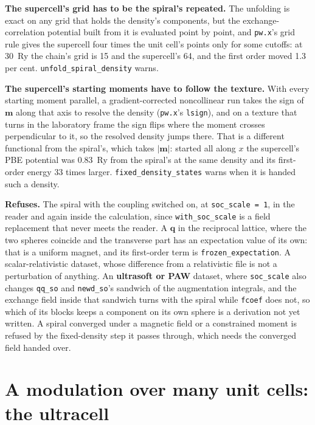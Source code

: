 \documentclass[11pt,a4paper]{article}
\newcommand{\code}[1]{\texttt{\small #1}}
\begin{document}
\textbf{The supercell's grid has to be the spiral's repeated.} The unfolding is
exact on any grid that holds the density's components, but the
exchange-correlation potential built from it is evaluated point by point, and
\code{pw.x}'s grid rule gives the supercell four times the unit cell's points
only for some cutoffs: at 30~Ry the chain's grid is 15 and the supercell's 64,
and the first order moved 1.3 per cent. \code{unfold\_spiral\_density} warns.

\textbf{The supercell's starting moments have to follow the texture.} With every
starting moment parallel, a gradient-corrected noncollinear run takes the sign
of $\mathbf m$ along that axis to resolve the density (\code{pw.x}'s
\code{lsign}), and on a texture that turns in the laboratory frame the sign
flips where the moment crosses perpendicular to it, so the resolved density
jumps there. That is a different functional from the spiral's, which takes
$|\mathbf m|$: started all along $x$ the supercell's PBE potential was 0.83~Ry
from the spiral's at the same density and its first-order energy 33 times
larger. \code{fixed\_density\_states} warns when it is handed such a density.

\begin{refuses}
\textbf{Refuses.} The spiral with the coupling switched on, at
\code{soc\_scale = 1}, in the reader and again inside the calculation, since
\code{with\_soc\_scale} is a field replacement that never meets the reader. A
$\mathbf q$ in the reciprocal lattice, where the two spheres coincide and the
transverse part has an expectation value of its own: that is a uniform magnet,
and its first-order term is \code{frozen\_expectation}. A scalar-relativistic
dataset, whose difference from a relativistic file is not a perturbation of
anything. An \textbf{ultrasoft or PAW} dataset, where \code{soc\_scale} also
changes \code{qq\_so} and \code{newd\_so}'s sandwich of the augmentation
integrals, and the exchange field inside that sandwich turns with the spiral
while \code{fcoef} does not, so which of its blocks keeps a component on its
own sphere is a derivation not yet written. A spiral converged under a
magnetic field or a constrained moment is refused by the fixed-density step it
passes through, which needs the converged field handed over.
\end{refuses}

\section{A modulation over many unit cells: the ultracell}
\end{document}
